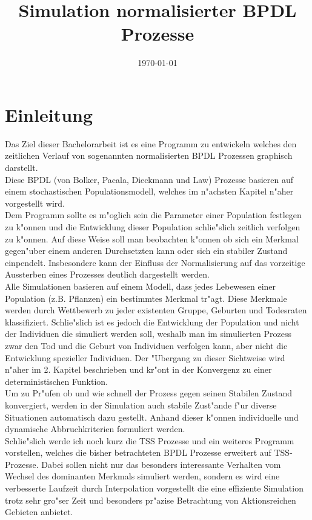 \documentclass[11pt, a4paper, german]{article}
\date{\today}
\title{Simulation normalisierter BPDL Prozesse}
\begin{document}
\maketitle
\tableofcontents

\clearpage


\section{Einleitung}
Das Ziel dieser Bachelorarbeit ist es eine Programm zu entwickeln welches den zeitlichen Verlauf von sogenannten normalisierten BPDL Prozessen graphisch darstellt.\\
Diese BPDL (von Bolker, Pacala, Dieckmann und Law) Prozesse basieren auf einem stochastischen Populationsmodell, welches im n"achsten Kapitel n"aher vorgestellt wird. \\

Dem Programm sollte es m"oglich sein die Parameter einer Population festlegen zu k"onnen und die Entwicklung dieser Population schlie"slich zeitlich verfolgen zu k"onnen. Auf diese Weise soll man beobachten k"onnen ob sich ein Merkmal gegen"uber einem anderen Durchsetzten kann oder sich ein stabiler Zustand einpendelt. Insbesondere kann der Einfluss der Normalisierung auf das vorzeitige Aussterben eines Prozesses deutlich dargestellt werden.\\

Alle Simulationen basieren auf einem Modell, dass jedes Lebewesen einer Population (z.B. Pflanzen) ein bestimmtes Merkmal tr"agt. Diese Merkmale werden durch Wettbewerb zu jeder existenten Gruppe, Geburten und Todesraten klassifiziert. Schlie"slich ist es jedoch die Entwicklung der Population und nicht der Individuen die simuliert werden soll, weshalb man im simulierten Prozess zwar den Tod und die Geburt von Individuen verfolgen kann, aber nicht die Entwicklung spezieller Individuen. Der "Ubergang zu dieser Sichtweise wird n"aher im 2. Kapitel beschrieben und kr"ont in der Konvergenz zu einer deterministischen Funktion.\\

Um zu Pr"ufen ob und wie schnell der Prozess gegen seinen Stabilen Zustand konvergiert, werden in der Simulation auch stabile Zust"ande f"ur diverse Situationen automatisch dazu gestellt. Anhand dieser k"onnen individuelle und dynamische Abbruchkriterien formuliert werden.\\

Schlie"slich werde ich noch kurz die TSS Prozesse und ein weiteres Programm vorstellen, welches die bisher betrachteten BPDL Prozesse erweitert auf TSS-Prozesse. Dabei sollen nicht nur das besonders interessante Verhalten vom Wechsel des dominanten Merkmals simuliert werden, sondern es wird eine verbesserte Laufzeit durch Interpolation vorgestellt die eine effiziente Simulation trotz sehr gro"ser Zeit und besonders pr"azise Betrachtung von Aktionsreichen Gebieten anbietet.
\end{document}
